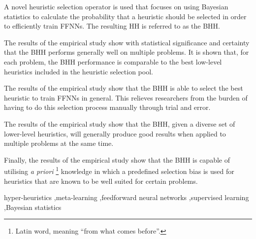 \documentclass[preprint,review,12pt]{elsarticle}
\begin{document}
\begin{frontmatter}
\begin{abstract}
  \end{abstract}


  \begin{highlights}
    \item A novel heuristic selection operator is used that focuses on using Bayesian statistics to calculate the probability that a heuristic should be selected in order to efficiently train \acp{FFNN}. The resulting \acs{HH} is referred to as the \acf{BHH}.

    \item The results of the empirical study show with statistical significance and certainty that the \Acs{BHH} performs generally well on multiple problems. It is shown that, for each problem, the \Acs{BHH} performance is comparable to the best low-level heuristics included in the heuristic selection pool.

    \item The results of the empirical study show that the \Acs{BHH} is able to select the best heuristic to train \acp{FFNN} in general. This relieves researchers from the burden of having to do this selection process manually through trial and error.

    \item The results of the empirical study show that the \Acs{BHH}, given a diverse set of lower-level heuristics, will generally produce good results when applied to multiple problems at the same time.

    \item Finally, the results of the empirical study show that the \Acs{BHH} is capable of utilising \textit{a priori} \footnote{Latin word, meaning ``from what comes before''.} knowledge in which a predefined selection bias is used for heuristics that are known to be well suited for certain problems.
  \end{highlights}

  \begin{keyword}

    hyper-heuristics \sep meta-learning \sep feedforward neural networks \sep supervised learning \sep Bayesian statistics

  \end{keyword}

\end{frontmatter}
\end{document}
